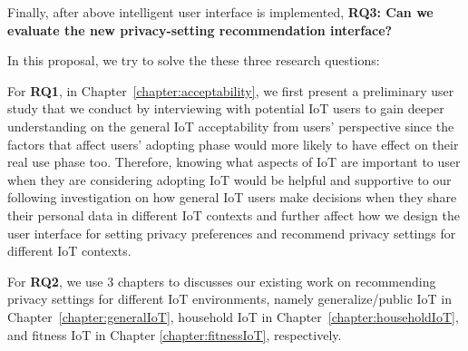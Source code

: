 Finally, after above intelligent user interface is implemented, \textbf{RQ3: Can we evaluate the new privacy-setting recommendation interface?} 

In this proposal, we try to solve the these three research questions:

For \textbf{RQ1}, in Chapter~\ref{chapter:acceptability}, we first present a preliminary user study that we conduct by interviewing with potential IoT users to gain deeper understanding on the general IoT acceptability from users' perspective since the factors that affect users' adopting phase would more likely to have effect on their real use phase too. Therefore, knowing what aspects of IoT are important to user when they are considering adopting IoT would be helpful and supportive to our following investigation on how general IoT users make decisions when they share their personal data in different IoT contexts and further affect how we design the user interface for setting privacy preferences and recommend privacy settings for different IoT contexts.

For \textbf{RQ2}, we use 3 chapters to  discusses our existing work on recommending privacy settings for different IoT environments, namely generalize/public IoT in Chapter~\ref{chapter:generalIoT}, household IoT in Chapter~\ref{chapter:householdIoT}, and fitness IoT in Chapter \ref{chapter:fitnessIoT}, respectively.

